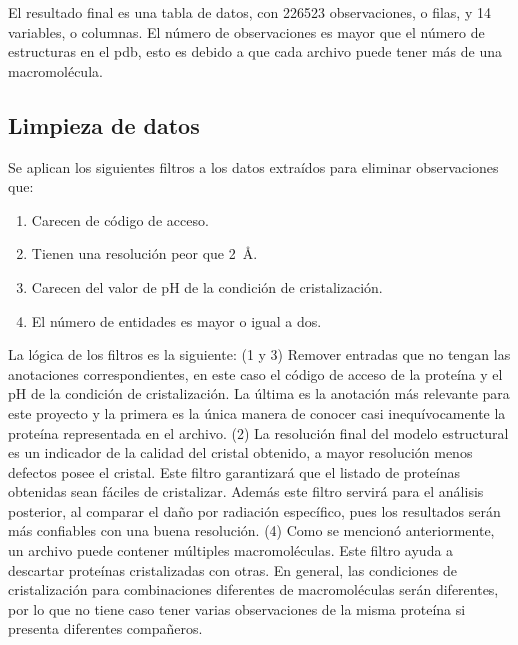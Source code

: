 El resultado final es una tabla de datos, con \num{226523} observaciones, o filas, y \num{14} variables, o columnas. El número de observaciones es mayor que el número de estructuras en el \acrshort{pdb}, esto es debido a que cada archivo puede tener más de una macromolécula. %

\subsection{Limpieza de datos}
Se aplican los siguientes filtros a los datos extraídos para eliminar observaciones que:

\begin{enumerate}
	\item Carecen de código de acceso.
	\item Tienen una resolución peor que \SI{2}{\angstrom}. 
	\item Carecen del valor de pH de la condición de cristalización.
	\item El número de entidades es mayor o igual a dos.
\end{enumerate}

La lógica de los filtros es la siguiente: (\num{1} y \num{3}) Remover entradas que no tengan las anotaciones correspondientes, en este caso el código de acceso de la proteína y el pH de la condición de cristalización. La última es la anotación más relevante para este proyecto y la primera es la única manera de conocer casi inequívocamente la proteína representada en el archivo. (\num{2}) La resolución final del modelo estructural es un indicador de la calidad del cristal obtenido, a mayor resolución menos defectos posee el cristal. Este filtro garantizará que el listado de proteínas obtenidas sean fáciles de cristalizar. Además este filtro servirá para el análisis posterior, al comparar el daño por radiación específico, pues los resultados serán más confiables con una buena resolución. (\num{4}) Como se mencionó anteriormente, un archivo puede contener múltiples macromoléculas. Este filtro ayuda a descartar proteínas cristalizadas con otras. En general, las condiciones de cristalización para combinaciones diferentes de macromoléculas serán diferentes, por lo que no tiene caso tener varias observaciones de la misma proteína si presenta diferentes compañeros. 

